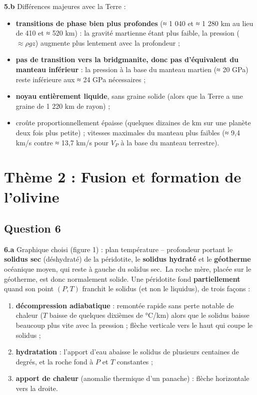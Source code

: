 \documentclass[11pt,a4paper]{article}
\providecommand{\tightlist}{\setlength{\itemsep}{0pt}\setlength{\parskip}{0pt}}
\begin{document}
\textbf{5.b} Différences majeures avec la Terre :

\begin{itemize}
\tightlist
\item
  \textbf{transitions de phase bien plus profondes} (≈ 1 040 et ≈ 1 280 km au lieu de 410 et ≈ 520 km) : la gravité martienne étant plus faible, la pression (\(\approx \rho g z\)) augmente plus lentement avec la profondeur ;
\item
  \textbf{pas de transition vers la bridgmanite, donc pas d'équivalent du manteau inférieur} : la pression à la base du manteau martien (≈ 20 GPa) reste inférieure aux ≈ 24 GPa nécessaires ;
\item
  \textbf{noyau entièrement liquide}, sans graine solide (alors que la Terre a une graine de 1 220 km de rayon) ;
\item
  croûte proportionnellement épaisse (quelques dizaines de km sur une planète deux fois plus petite) ; vitesses maximales du manteau plus faibles (≈ 9,4 km/s contre ≈ 13,7 km/s pour \(V_P\) à la base du manteau terrestre).
\end{itemize}

\hypertarget{thuxe8me-2-fusion-et-formation-de-lolivine}{%
\section{Thème 2 : Fusion et formation de l'olivine}\label{thuxe8me-2-fusion-et-formation-de-lolivine}}

\hypertarget{question-6}{%
\subsection{Question 6}\label{question-6}}

\textbf{6.a} Graphique choisi (figure 1) : plan température -- profondeur portant le \textbf{solidus sec} (déshydraté) de la péridotite, le \textbf{solidus hydraté} et le \textbf{géotherme} océanique moyen, qui reste à gauche du solidus sec.~La roche mère, placée sur le géotherme, est donc normalement solide. Une péridotite fond \textbf{partiellement} quand son point \((P,T)\) franchit le solidus (et non le liquidus), de trois façons :

\begin{enumerate}
\def\labelenumi{\arabic{enumi}.}
\tightlist
\item
  \textbf{décompression adiabatique} : remontée rapide sans perte notable de chaleur (\(T\) baisse de quelques dixièmes de °C/km) alors que le solidus baisse beaucoup plus vite avec la pression ; flèche verticale vers le haut qui coupe le solidus ;
\item
  \textbf{hydratation} : l'apport d'eau abaisse le solidus de plusieurs centaines de degrés, et la roche fond à \(P\) et \(T\) constantes ;
\item
  \textbf{apport de chaleur} (anomalie thermique d'un panache) : flèche horizontale vers la droite.
\end{enumerate}
\end{document}
